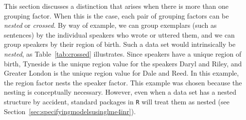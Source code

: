 \documentclass[a4paper,12pt]{article}
\begin{document}
This section discusses a distinction that arises when there is more than one grouping factor.
When this is the case, each pair of grouping factors can be \textit{nested} or \textit{crossed}.
By way of example, we can group exemplars (such as sentences) by the individual speakers who wrote or uttered them, and we can group speakers by their region of birth.
Such a data set would intrinsically be \textit{nested}, as Table~\ref{tab:crossed} illustrates.
Since speakers have a unique region of birth, Tyneside is the unique region value for the speakers Daryl and Riley, and Greater London is the unique region value for Dale and Reed.
In this example, the region factor nests the speaker factor.
This example was chosen because the nesting is conceptually necessary.
However, even when a data set has a nested structure by accident, standard packages in \texttt{R} will treat them as nested
(see Section~\ref{sec:specifyingmodelsusinglme4inr}).
\end{document}
